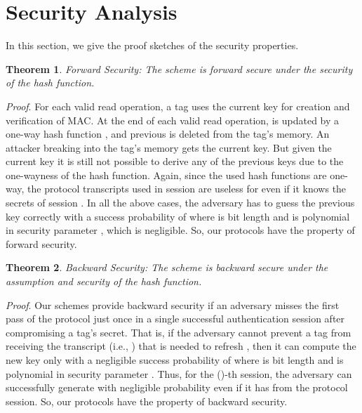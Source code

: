 \documentclass{easychair}
\newtheorem{theorem}{Theorem}{\bfseries}{\itshape}
\begin{document}
\section{Security Analysis}

In this section, we give the proof sketches of the security properties.

\begin{theorem}{Forward Security:}
The scheme is forward secure under the security of the hash function.
\end{theorem}
\textit{Proof}. For each valid read operation, a tag uses the current key  for creation and 
verification of MAC. At the end of each valid read operation, 
 is updated by a one-way hash function , and previous  is deleted from the tag's memory. An attacker breaking into the tag's memory gets the current key. But given the current key  it is still not possible to derive any of the 
previous keys due to the one-wayness of the hash function. Again, since the used hash functions are one-way, the protocol transcripts used in session  are useless for  even if it knows the secrets of session . In all the above cases, the adversary has to guess the previous key correctly with a success probability of  where  is bit length and is polynomial in security parameter , which is negligible. So, our protocols have the property of forward security. 

\begin{theorem}{Backward Security:}
The scheme is backward secure under the assumption and security of the hash function.
\end{theorem}
\textit{Proof}. Our schemes provide backward security if an adversary misses the first pass of the protocol just once
in a single successful authentication session after compromising
a tag's secret. That is, if the adversary cannot prevent a tag from receiving the transcript (i.e., ) that is
needed to refresh , then it can compute the new
key  only with a negligible success probability of  where  is bit length and is polynomial in security parameter . Thus, for the ()-th session, the adversary can successfully generate  with negligible probability even if it has  from the protocol session. So, our protocols have the property of backward security. 
\end{document}
